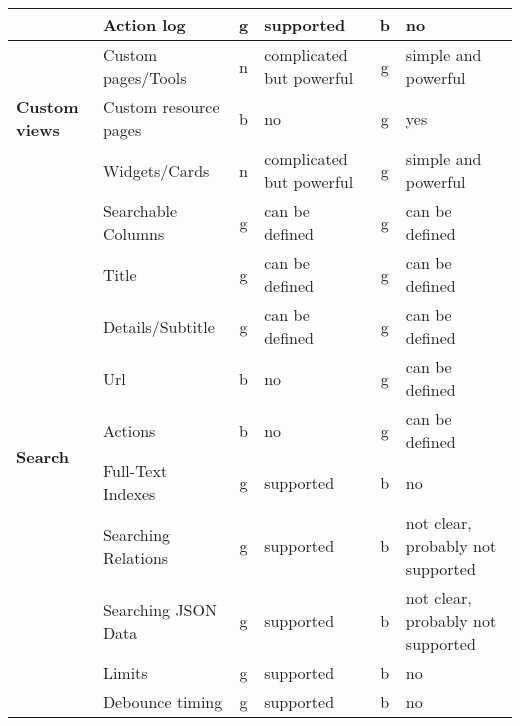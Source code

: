 \begin{table}[]
{\begin{tabular}{llclcl}
            & Action log             & g           & supported                       & b           & no                                       \\
            \hline
            \multirow{3}{*}{\textbf{Custom views}}   & Custom pages/Tools     & n           & complicated but powerful        & g           & simple and powerful                      \\
            & Custom resource pages  & b           & no                              & g           & yes                                      \\
            & Widgets/Cards          & n           & complicated but powerful        & g           & simple and powerful                      \\
            \hline
            \multirow{12}{*}{\textbf{Search}}        & Searchable Columns     & g           & can be defined                  & g           & can be defined                           \\
            & Title                  & g           & can be defined                  & g           & can be defined                           \\
            & Details/Subtitle       & g           & can be defined                  & g           & can be defined                           \\
            & Url                    & b           & no                              & g           & can be defined                           \\
            & Actions                & b           & no                              & g           & can be defined                           \\
            & Full-Text Indexes      & g           & supported                       & b           & no                                       \\
            & Searching Relations    & g           & supported                       & b           & not clear, probably not supported        \\
            & Searching JSON Data    & g           & supported                       & b           & not clear, probably not supported        \\
            & Limits                 & g           & supported                       & b           & no                                       \\
            & Debounce timing        & g           & supported                       & b           & no                                       \\

\end{tabular}}
\end{table}
